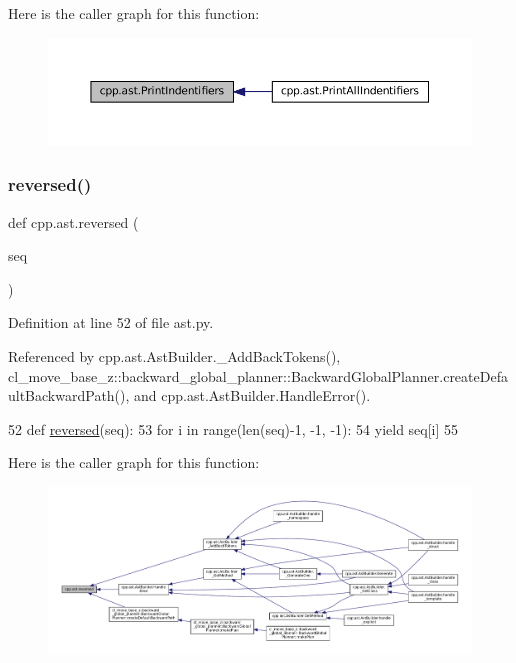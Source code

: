 Here is the caller graph for this function\+:
\nopagebreak
\begin{figure}[H]
\begin{center}
\leavevmode
\includegraphics[width=350pt]{namespacecpp_1_1ast_a6a793b93aff7779af7017d001ce3b226_icgraph}
\end{center}
\end{figure}
\mbox{\label{namespacecpp_1_1ast_a0b1c00fd4aaa476b10de6b3a2550f39f}} 
\subsubsection{\texorpdfstring{reversed()}{reversed()}}
{\footnotesize\ttfamily def cpp.\+ast.\+reversed (\begin{DoxyParamCaption}\item[{}]{seq }\end{DoxyParamCaption})}



Definition at line 52 of file ast.\+py.



Referenced by cpp.\+ast.\+Ast\+Builder.\+\_\+\+Add\+Back\+Tokens(), cl\+\_\+move\+\_\+base\+\_\+z\+::backward\+\_\+global\+\_\+planner\+::\+Backward\+Global\+Planner.\+create\+Default\+Backward\+Path(), and cpp.\+ast.\+Ast\+Builder.\+Handle\+Error().


\begin{DoxyCode}
52     \textcolor{keyword}{def }\hyperlink{namespacecpp_1_1ast_a0b1c00fd4aaa476b10de6b3a2550f39f}{reversed}(seq):
53         \textcolor{keywordflow}{for} i \textcolor{keywordflow}{in} range(len(seq)-1, -1, -1):
54             \textcolor{keywordflow}{yield} seq[i]
55 
\end{DoxyCode}
Here is the caller graph for this function\+:
\nopagebreak
\begin{figure}[H]
\begin{center}
\leavevmode
\includegraphics[width=350pt]{namespacecpp_1_1ast_a0b1c00fd4aaa476b10de6b3a2550f39f_icgraph}
\end{center}
\end{figure}


